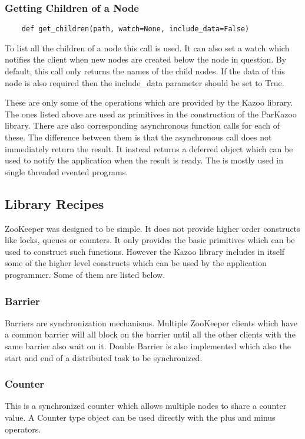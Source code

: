   \subsubsection{Getting Children of a Node}
  \begin{lstlisting}
    def get_children(path, watch=None, include_data=False)
  \end{lstlisting}
  To list all the children of a node this call is used. It can also set a watch which notifies the client when new nodes are created below the node in question. By default, this call only returns the names of the child nodes. If the data of this node is also required then the include\_data parameter should be set to True.
  
  These are only some of the operations which are provided by the Kazoo library. The ones listed above are used as primitives in the construction of the ParKazoo library. There are also corresponding asynchronous function calls for each of these. The difference between them is that the asynchronous call does not immediately return the result. It instead returns a deferred object which can be used to notify the application when the result is ready. The is mostly used in single threaded evented programs.
  
\subsection{Library Recipes}
  ZooKeeper was designed to be simple. It does not provide higher order constructs like locks, queues or counters. It only provides the basic primitives which can be used to construct such functions. However the Kazoo library includes in itself some of the higher level constructs which can be used by the application programmer. Some of them are listed below.
  \subsubsection{Barrier}
    Barriers are synchronization mechanisms. Multiple ZooKeeper clients which have a common barrier will all block on the barrier until all the other clients with the same barrier also wait on it. Double Barrier is also implemented which also the start and end of a distributed task to be synchronized.
  \subsubsection{Counter}
  This is a synchronized counter which allows multiple nodes to share a counter value. A Counter type object can be used directly with the plus and minus operators.
